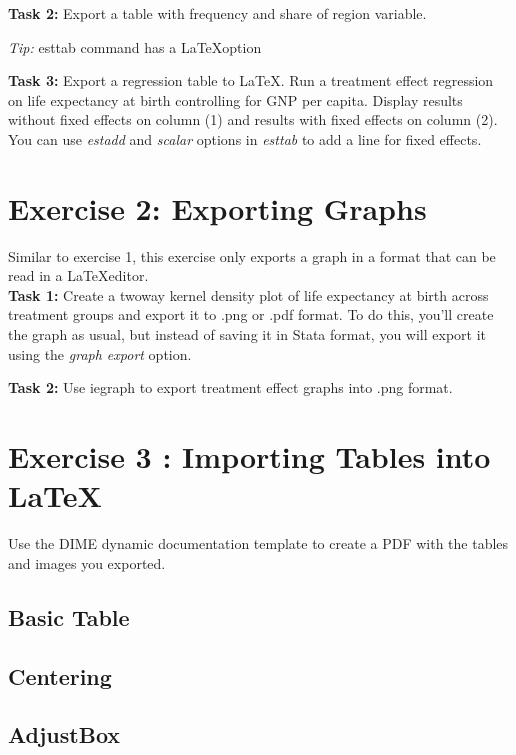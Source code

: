 \documentclass[12pts]{report}
\begin{document}
\textbf{Task 2:}  Export a table with frequency and share of region variable. 
\begin{center}
	\colorbox{BurntOrange}{\emph{Tip:} esttab command has a \LaTeX\space option}
\end{center}

\textbf{Task 3:} Export a regression table to \LaTeX. Run a treatment effect regression on life expectancy at birth controlling for GNP per capita. Display results without fixed effects on column (1) and results with fixed effects on column (2). You can use \textit{estadd} and \textit{scalar} options in \textit{esttab} to add a line for fixed effects.

\section*{Exercise 2: Exporting Graphs}
Similar to exercise 1, this exercise only exports a graph in a format that can be read in a \LaTeX\space editor. \\

\textbf{Task 1:}  Create a twoway kernel density plot of life expectancy at birth across treatment groups and export it to .png or .pdf format. To do this, you'll create the graph as usual, but instead of saving it in Stata format, you will export it using the \textit{graph export} option. 

\textbf{Task 2:}  Use iegraph to export treatment effect graphs into .png format.

\section*{Exercise 3 : Importing Tables into \LaTeX}
Use the DIME dynamic documentation template to create a PDF with the tables and images you exported.

\subsection*{Basic Table}

\subsection*{Centering}

\subsection*{AdjustBox}
\end{document}
